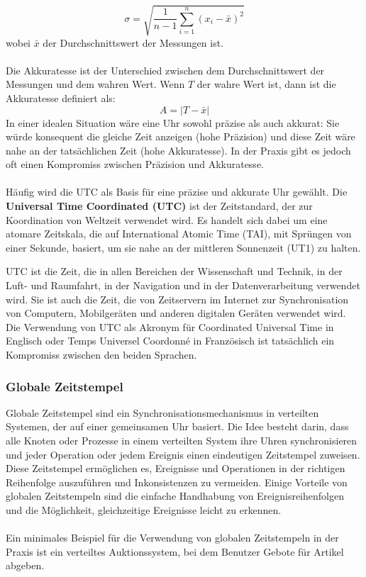 \begin{equation}
\sigma = \sqrt{\frac{1}{n-1} \sum_{i=1}^{n} (x_i - \bar{x})^2}
\end{equation}
wobei $\bar{x}$ der Durchschnittswert der Messungen ist.
\\\\
Die Akkuratesse ist der Unterschied zwischen dem Durchschnittswert der Messungen und dem wahren Wert. Wenn $T$ der wahre Wert ist, dann ist die Akkuratesse definiert als:
\begin{equation}
A = |T - \bar{x}|
\end{equation}
In einer idealen Situation wäre eine Uhr sowohl präzise als auch akkurat: Sie würde konsequent die gleiche Zeit anzeigen (hohe Präzision) und diese Zeit wäre nahe an der tatsächlichen Zeit (hohe Akkuratesse). In der Praxis gibt es jedoch oft einen Kompromiss zwischen Präzision und Akkuratesse.
\\\\
Häufig wird die UTC als Basis für eine präzise und akkurate Uhr gewählt.
Die \textbf{Universal Time Coordinated (UTC)} ist der Zeitstandard, der zur Koordination von Weltzeit verwendet wird. Es handelt sich dabei um eine atomare Zeitskala, die auf International Atomic Time (TAI), mit Sprüngen von einer Sekunde, basiert, um sie nahe an der mittleren Sonnenzeit (UT1) zu halten.

UTC ist die Zeit, die in allen Bereichen der Wissenschaft und Technik, in der Luft- und Raumfahrt, in der Navigation und in der Datenverarbeitung verwendet wird. Sie ist auch die Zeit, die von Zeitservern im Internet zur Synchronisation von Computern, Mobilgeräten und anderen digitalen Geräten verwendet wird.
Die Verwendung von UTC als Akronym für Coordinated Universal Time in Englisch oder Temps Universel Coordonné in Französisch ist tatsächlich ein Kompromiss zwischen den beiden Sprachen.


\subsubsection{Globale Zeitstempel}
Globale Zeitstempel sind ein Synchronisationsmechanismus in verteilten Systemen, der auf einer gemeinsamen Uhr basiert. Die Idee besteht darin, dass alle Knoten oder Prozesse in einem verteilten System ihre Uhren synchronisieren und jeder Operation oder jedem Ereignis einen eindeutigen Zeitstempel zuweisen. Diese Zeitstempel ermöglichen es, Ereignisse und Operationen in der richtigen Reihenfolge auszuführen und Inkonsistenzen zu vermeiden. Einige Vorteile von globalen Zeitstempeln sind die einfache Handhabung von Ereignisreihenfolgen und die Möglichkeit, gleichzeitige Ereignisse leicht zu erkennen.
\\\\
Ein minimales Beispiel für die Verwendung von globalen Zeitstempeln in der Praxis ist ein verteiltes Auktionssystem, bei dem Benutzer Gebote für Artikel abgeben.

